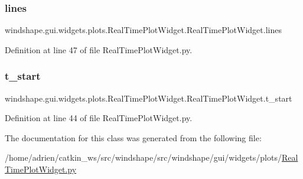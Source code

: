 \subsubsection{\texorpdfstring{lines}{lines}}
{\footnotesize\ttfamily windshape.\+gui.\+widgets.\+plots.\+Real\+Time\+Plot\+Widget.\+Real\+Time\+Plot\+Widget.\+lines}



Definition at line 47 of file Real\+Time\+Plot\+Widget.\+py.

\mbox{\label{classwindshape_1_1gui_1_1widgets_1_1plots_1_1_real_time_plot_widget_1_1_real_time_plot_widget_ac4808d14dafac55bf240df7ef6f0b1f7}} 
\subsubsection{\texorpdfstring{t\+\_\+start}{t\_start}}
{\footnotesize\ttfamily windshape.\+gui.\+widgets.\+plots.\+Real\+Time\+Plot\+Widget.\+Real\+Time\+Plot\+Widget.\+t\+\_\+start}



Definition at line 44 of file Real\+Time\+Plot\+Widget.\+py.



The documentation for this class was generated from the following file\+:\begin{DoxyCompactItemize}
\item 
/home/adrien/catkin\+\_\+ws/src/windshape/src/windshape/gui/widgets/plots/\mbox{\hyperlink{_real_time_plot_widget_8py}{Real\+Time\+Plot\+Widget.\+py}}\end{DoxyCompactItemize}
